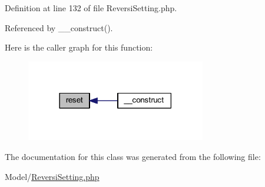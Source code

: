 Definition at line 132 of file Reversi\+Setting.\+php.



Referenced by \+\_\+\+\_\+construct().



Here is the caller graph for this function\+:
\nopagebreak
\begin{figure}[H]
\begin{center}
\leavevmode
\includegraphics[width=222pt]{class_reversi_setting_a4a20559544fdf4dcb457e258dc976cf8_icgraph}
\end{center}
\end{figure}




The documentation for this class was generated from the following file\+:\begin{DoxyCompactItemize}
\item 
Model/\hyperlink{_reversi_setting_8php}{Reversi\+Setting.\+php}\end{DoxyCompactItemize}
